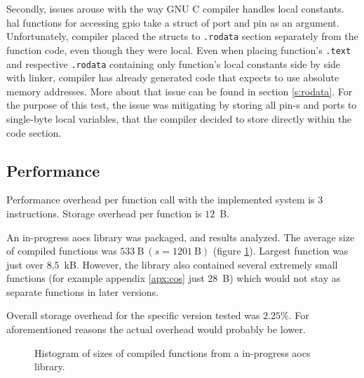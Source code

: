 Secondly, issues arouse with the way GNU C compiler handles local constants. \Gls{hal} functions for accessing \gls{gpio} take a struct of port and pin as an argument. Unfortunately, compiler placed the structs to \texttt{.rodata} section separately from the function code, even though they were local. Even when placing function's \texttt{.text} and respective \texttt{.rodata} containing only function's local constants side by side with linker, compiler has already generated code that expects to use absolute memory addresses. More about that issue can be found in section \ref{s:rodata}. For the purpose of this test, the issue was mitigating by storing all pin-s and ports to single-byte local variables, that the compiler decided to store directly within the code section.

\subsection{Performance}

Performance overhead per function call with the implemented system is $3$ instructions. Storage overhead per function is $12$~B.

An in-progress \gls{aocs} library was packaged, and results analyzed. The average size of compiled functions was $533~\text{B}\ (s=1201~\text{B})$ (figure \ref{fig:kalman}). Largest function was just over $8.5$~kB. However, the library also contained several extremely small functions (for example appendix \ref{apx:cos} just $28$~B) which would not stay as separate functions in later versions.

Overall storage overhead for the specific version tested was $2.25\%$. For aforementioned reasons the actual overhead would probably be lower.

\begin{figure} [htb]
\caption{Histogram of sizes of compiled functions from a in-progress \gls{aocs} library.}
\label{fig:kalman}
\end{figure}

